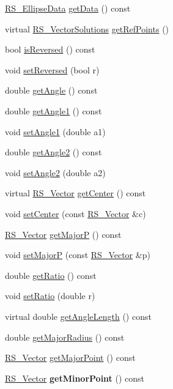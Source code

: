 \begin{DoxyCompactItemize}
\item 
\hyperlink{classRS__EllipseData}{R\-S\-\_\-\-Ellipse\-Data} \hyperlink{classRS__Ellipse_a69ff4bbee22914c3a19282f625241876}{get\-Data} () const 
\item 
virtual \hyperlink{classRS__VectorSolutions}{R\-S\-\_\-\-Vector\-Solutions} \hyperlink{classRS__Ellipse_a52a220bcc829d41eb6cf167a529e10b8}{get\-Ref\-Points} ()
\item 
bool \hyperlink{classRS__Ellipse_a506f7e1f7d8a334743c088093c524850}{is\-Reversed} () const 
\item 
void \hyperlink{classRS__Ellipse_ae7c0e3ce709d61e9ca79d731c6e21004}{set\-Reversed} (bool r)
\item 
double \hyperlink{classRS__Ellipse_a6fe415728b0f748ad1d0c2f062d41c9d}{get\-Angle} () const 
\item 
double \hyperlink{classRS__Ellipse_ab560771ba18a5e40b18f6e751e6804dc}{get\-Angle1} () const 
\item 
void \hyperlink{classRS__Ellipse_a987c7c5b621e17fb67db77ef2f9f52e6}{set\-Angle1} (double a1)
\item 
double \hyperlink{classRS__Ellipse_a0608e2bc5741894dbbcfd8384fea2912}{get\-Angle2} () const 
\item 
void \hyperlink{classRS__Ellipse_ababc7b1e1e5597673880b4aac5ebf097}{set\-Angle2} (double a2)
\item 
virtual \hyperlink{classRS__Vector}{R\-S\-\_\-\-Vector} \hyperlink{classRS__Ellipse_a4c1bbbc6ee2ad27c35ac1c932169a077}{get\-Center} () const 
\item 
void \hyperlink{classRS__Ellipse_ae637e5155d6749747a6d9b2deb0a929d}{set\-Center} (const \hyperlink{classRS__Vector}{R\-S\-\_\-\-Vector} \&c)
\item 
\hyperlink{classRS__Vector}{R\-S\-\_\-\-Vector} \hyperlink{classRS__Ellipse_af2cb001917d91d5f499ded4efbabd13f}{get\-Major\-P} () const 
\item 
void \hyperlink{classRS__Ellipse_a33530df39b5282b2069ad43746257956}{set\-Major\-P} (const \hyperlink{classRS__Vector}{R\-S\-\_\-\-Vector} \&p)
\item 
double \hyperlink{classRS__Ellipse_a0f18ee7677809fc1ed6087f71c1f947d}{get\-Ratio} () const 
\item 
void \hyperlink{classRS__Ellipse_a0cc133aa4a811a26b1aa1b12fb4a1fd0}{set\-Ratio} (double r)
\item 
virtual double \hyperlink{classRS__Ellipse_a2718a712a818603842cc08f7307ceb0c}{get\-Angle\-Length} () const 
\item 
double \hyperlink{classRS__Ellipse_abf6b1d63eab920fe4b2609056c92adde}{get\-Major\-Radius} () const 
\item 
\hyperlink{classRS__Vector}{R\-S\-\_\-\-Vector} \hyperlink{classRS__Ellipse_a38b17d1a4abaaa3ce4c085f1bc667702}{get\-Major\-Point} () const 
\item 
\hypertarget{classRS__Ellipse_aa732850ffa6e1cf34bed71ace042ee0d}{\hyperlink{classRS__Vector}{R\-S\-\_\-\-Vector} {\bfseries get\-Minor\-Point} () const }\label{classRS__Ellipse_aa732850ffa6e1cf34bed71ace042ee0d}


\end{DoxyCompactItemize}
